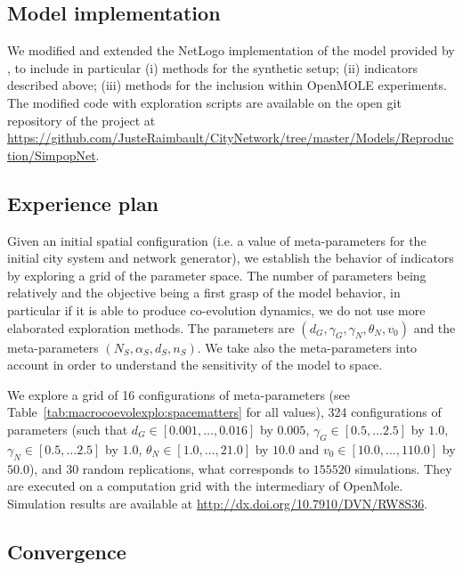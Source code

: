 \subsection{Model implementation}

We modified and extended the NetLogo implementation of the model provided by \cite{schmitt2014modelisation}, to include in particular (i) methods for the synthetic setup; (ii) indicators described above; (iii) methods for the inclusion within OpenMOLE experiments. The modified code with exploration scripts are available on the open git repository of the project at \url{https://github.com/JusteRaimbault/CityNetwork/tree/master/Models/Reproduction/SimpopNet}.



\subsection{Experience plan}

Given an initial spatial configuration (i.e. a value of meta-parameters for the initial city system and network generator), we establish the behavior of indicators by exploring a grid of the parameter space. The number of parameters being relatively and the objective being a first grasp of the model behavior, in particular if it is able to produce co-evolution dynamics, we do not use more elaborated exploration methods. The parameters are $(d_G,\gamma_G,\gamma_N,\theta_N,v_0)$ and the meta-parameters $(N_S,\alpha_S,d_S,n_S)$. We take also the meta-parameters into account in order to understand the sensitivity of the model to space.

We explore a grid of 16 configurations of meta-parameters (see Table~\ref{tab:macrocoevolexplo:spacematters} for all values), 324 configurations of parameters (such that $d_G \in \left[0.001, \ldots , 0.016\right]$ by $0.005$, $\gamma_G \in \left[0.5 , \ldots 2.5\right]$ by $1.0$, $\gamma_N \in \left[0.5 , \ldots 2.5\right]$ by $1.0$, $\theta_N \in \left[1.0 , \ldots , 21.0\right]$ by $10.0$ and $v_0 \in \left[10.0, \ldots , 110.0\right]$ by $50.0$), and 30 random replications, what corresponds to $155520$ simulations. They are executed on a computation grid with the intermediary of OpenMole. Simulation results are available at \url{http://dx.doi.org/10.7910/DVN/RW8S36}.



\subsection{Convergence}


